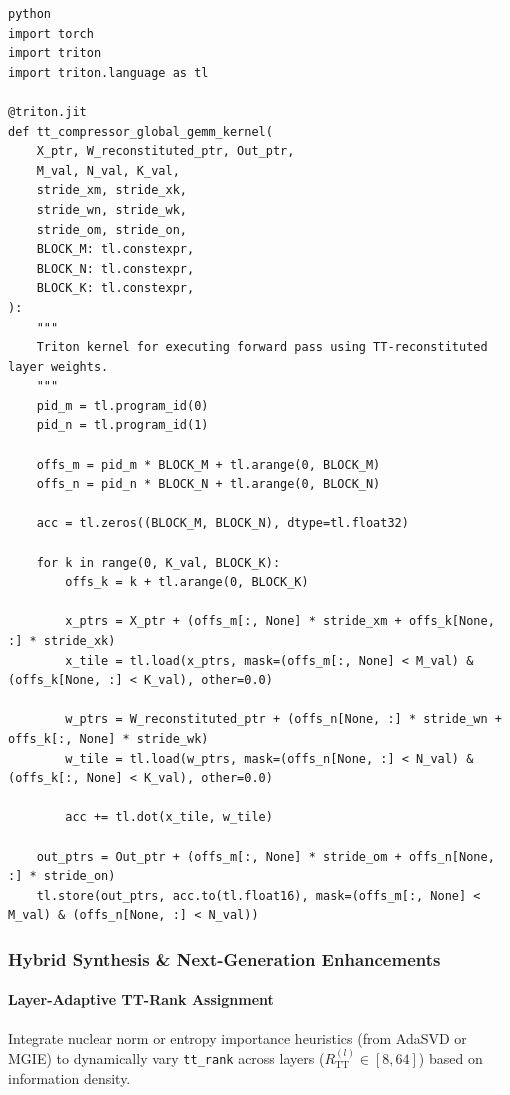 \vspace{0.5em}
\begin{mdframed}[backgroundcolor=codebg, linecolor=codeframe, linewidth=1pt, roundcorner=4pt, innerleftmargin=2pt, innerrightmargin=5pt, innertopmargin=5pt, innerbottommargin=5pt]
\begin{lstlisting}
python
import torch
import triton
import triton.language as tl

@triton.jit
def tt_compressor_global_gemm_kernel(
    X_ptr, W_reconstituted_ptr, Out_ptr,
    M_val, N_val, K_val,
    stride_xm, stride_xk,
    stride_wn, stride_wk,
    stride_om, stride_on,
    BLOCK_M: tl.constexpr,
    BLOCK_N: tl.constexpr,
    BLOCK_K: tl.constexpr,
):
    """
    Triton kernel for executing forward pass using TT-reconstituted layer weights.
    """
    pid_m = tl.program_id(0)
    pid_n = tl.program_id(1)

    offs_m = pid_m * BLOCK_M + tl.arange(0, BLOCK_M)
    offs_n = pid_n * BLOCK_N + tl.arange(0, BLOCK_N)

    acc = tl.zeros((BLOCK_M, BLOCK_N), dtype=tl.float32)

    for k in range(0, K_val, BLOCK_K):
        offs_k = k + tl.arange(0, BLOCK_K)

        x_ptrs = X_ptr + (offs_m[:, None] * stride_xm + offs_k[None, :] * stride_xk)
        x_tile = tl.load(x_ptrs, mask=(offs_m[:, None] < M_val) & (offs_k[None, :] < K_val), other=0.0)

        w_ptrs = W_reconstituted_ptr + (offs_n[None, :] * stride_wn + offs_k[:, None] * stride_wk)
        w_tile = tl.load(w_ptrs, mask=(offs_n[None, :] < N_val) & (offs_k[:, None] < K_val), other=0.0)

        acc += tl.dot(x_tile, w_tile)

    out_ptrs = Out_ptr + (offs_m[:, None] * stride_om + offs_n[None, :] * stride_on)
    tl.store(out_ptrs, acc.to(tl.float16), mask=(offs_m[:, None] < M_val) & (offs_n[None, :] < N_val))
\end{lstlisting}
\end{mdframed}
\vspace{0.5em}


\subsubsection*{Hybrid Synthesis \& Next-Generation Enhancements}

\paragraph{Layer-Adaptive TT-Rank Assignment}
Integrate nuclear norm or entropy importance heuristics (from AdaSVD or MGIE) to dynamically vary \texttt{tt\_rank} across layers ($R_{\text{TT}}^{(l)} \in [8, 64]$) based on information density.

